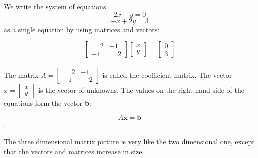 \documentclass{ximera}
\begin{document}
\noindent
\begin{example}
We write the system of equations
\[2x-y = 0\]
\[-x+2y = 3\]
as a single equation by using matrices and vectors:

\[\begin{bmatrix} \phantom{-}2 & -1\\ -1 & \phantom{-}2 \end{bmatrix} \begin{bmatrix} x\\y \end{bmatrix} =  \begin{bmatrix} 0\\3 \end{bmatrix}\]\\

\noindent
The matrix $A = \begin{bmatrix} \phantom{-}2 & -1\\-1 & \phantom{-}2 \end{bmatrix}$ is called the coefficient matrix. The vector $x = \begin{bmatrix} x\\y \end{bmatrix}$ is the vector of unknowns. The values on the right hand side of the
equations form the vector \textbf{b}:

\[A\textbf{x} = \textbf{b}\].
\end{example}

\noindent
The three dimensional matrix picture is very like the two dimensional one, except that the vectors and matrices increase in size.
\par
\end{document}
